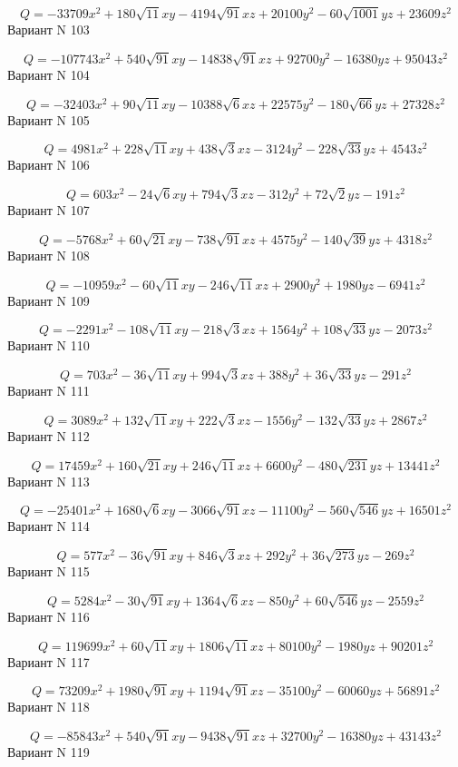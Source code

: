 \documentclass[11pt]{report}
\begin{document}
$$Q = - 33709 x^{2} + 180 \sqrt{11} x y - 4194 \sqrt{91} x z + 20100 y^{2} - 60 \sqrt{1001} y z + 23609 z^{2}$$Вариант N 103

$$Q = - 107743 x^{2} + 540 \sqrt{91} x y - 14838 \sqrt{91} x z + 92700 y^{2} - 16380 y z + 95043 z^{2}$$Вариант N 104

$$Q = - 32403 x^{2} + 90 \sqrt{11} x y - 10388 \sqrt{6} x z + 22575 y^{2} - 180 \sqrt{66} y z + 27328 z^{2}$$Вариант N 105

$$Q = 4981 x^{2} + 228 \sqrt{11} x y + 438 \sqrt{3} x z - 3124 y^{2} - 228 \sqrt{33} y z + 4543 z^{2}$$Вариант N 106

$$Q = 603 x^{2} - 24 \sqrt{6} x y + 794 \sqrt{3} x z - 312 y^{2} + 72 \sqrt{2} y z - 191 z^{2}$$Вариант N 107

$$Q = - 5768 x^{2} + 60 \sqrt{21} x y - 738 \sqrt{91} x z + 4575 y^{2} - 140 \sqrt{39} y z + 4318 z^{2}$$Вариант N 108

$$Q = - 10959 x^{2} - 60 \sqrt{11} x y - 246 \sqrt{11} x z + 2900 y^{2} + 1980 y z - 6941 z^{2}$$Вариант N 109

$$Q = - 2291 x^{2} - 108 \sqrt{11} x y - 218 \sqrt{3} x z + 1564 y^{2} + 108 \sqrt{33} y z - 2073 z^{2}$$Вариант N 110

$$Q = 703 x^{2} - 36 \sqrt{11} x y + 994 \sqrt{3} x z + 388 y^{2} + 36 \sqrt{33} y z - 291 z^{2}$$Вариант N 111

$$Q = 3089 x^{2} + 132 \sqrt{11} x y + 222 \sqrt{3} x z - 1556 y^{2} - 132 \sqrt{33} y z + 2867 z^{2}$$Вариант N 112

$$Q = 17459 x^{2} + 160 \sqrt{21} x y + 246 \sqrt{11} x z + 6600 y^{2} - 480 \sqrt{231} y z + 13441 z^{2}$$Вариант N 113

$$Q = - 25401 x^{2} + 1680 \sqrt{6} x y - 3066 \sqrt{91} x z - 11100 y^{2} - 560 \sqrt{546} y z + 16501 z^{2}$$Вариант N 114

$$Q = 577 x^{2} - 36 \sqrt{91} x y + 846 \sqrt{3} x z + 292 y^{2} + 36 \sqrt{273} y z - 269 z^{2}$$Вариант N 115

$$Q = 5284 x^{2} - 30 \sqrt{91} x y + 1364 \sqrt{6} x z - 850 y^{2} + 60 \sqrt{546} y z - 2559 z^{2}$$Вариант N 116

$$Q = 119699 x^{2} + 60 \sqrt{11} x y + 1806 \sqrt{11} x z + 80100 y^{2} - 1980 y z + 90201 z^{2}$$Вариант N 117

$$Q = 73209 x^{2} + 1980 \sqrt{91} x y + 1194 \sqrt{91} x z - 35100 y^{2} - 60060 y z + 56891 z^{2}$$Вариант N 118

$$Q = - 85843 x^{2} + 540 \sqrt{91} x y - 9438 \sqrt{91} x z + 32700 y^{2} - 16380 y z + 43143 z^{2}$$Вариант N 119
\end{document}
